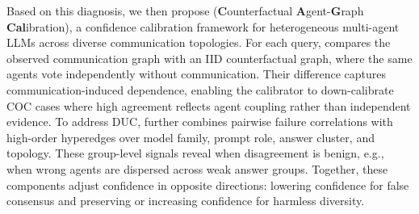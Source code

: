Based on this diagnosis, we then propose \methodname{} 
(\textbf{C}ounterfactual \textbf{A}gent-\textbf{G}raph \textbf{Cal}ibration), 
a confidence calibration framework for heterogeneous multi-agent LLMs across diverse communication topologies.
For each query, \methodname{} compares the observed communication graph with an IID counterfactual graph, where the same agents vote independently without communication. Their difference captures communication-induced dependence, enabling the calibrator to down-calibrate COC cases where high agreement reflects agent coupling rather than independent evidence. To address DUC, \methodname{} further combines pairwise failure correlations with high-order hyperedges over model family, prompt role, answer cluster, and topology. These group-level signals reveal when disagreement is benign, e.g., when wrong agents are dispersed across weak answer groups.
%
Together, these components adjust confidence in opposite directions: lowering confidence for false consensus and preserving or increasing confidence for harmless diversity.



